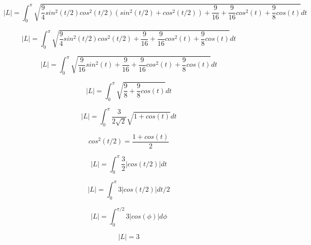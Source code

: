 \documentclass{article}
\begin{document}
\begin{equation*}
    |L| = \int_{0}^{\pi} \sqrt{\frac{9}{4} sin^2(t/2) cos^2(t/2) (sin^2(t/2)+cos^2(t/2))+\frac{9}{16}+\frac{9}{16}cos^2(t)+\frac{9}{8}cos(t)}dt
\end{equation*}

\begin{equation*}
    |L| = \int_{0}^{\pi} \sqrt{\frac{9}{4} sin^2(t/2) cos^2(t/2)+\frac{9}{16}+\frac{9}{16}cos^2(t)+\frac{9}{8}cos(t)}dt
\end{equation*}

\begin{equation*}
    |L| = \int_{0}^{\pi} \sqrt{\frac{9}{16} sin^2(t)+\frac{9}{16}+\frac{9}{16}cos^2(t)+\frac{9}{8}cos(t)}dt
\end{equation*}

\begin{equation*}
    |L| = \int_{0}^{\pi} \sqrt{\frac{9}{8}+\frac{9}{8}cos(t)}dt
\end{equation*}

\begin{equation*}
    |L| = \int_{0}^{\pi} \frac{3}{2\sqrt{2}} \sqrt{1+cos(t)}dt
\end{equation*}

\begin{equation*}
    cos^2(t/2) = \frac{1+cos(t)}{2}
\end{equation*}

\begin{equation*}
    |L| = \int_{0}^{\pi} \frac{3}{2} | cos(t/2) | dt
\end{equation*}

\begin{equation*}
    |L| = \int_{0}^{\pi} 3 | cos(t/2) | dt/2
\end{equation*}

\begin{equation*}
    |L| = \int_{0}^{\pi/2} 3 | cos(\phi) | d\phi
\end{equation*}

\begin{equation}
    |L| = 3
\end{equation}


\newpage
\end{document}
